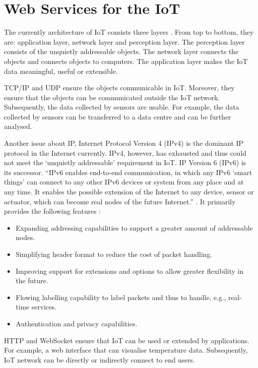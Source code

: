 \section{Web Services for the IoT}
The currently architecture of IoT consists three layers \cite{wu2010research}. From top to bottom, they are: application layer, network layer and perception layer. The perception layer consists of the unquietly addressable objects. The network layer connects the objects and connects objects to computers. The application layer makes the IoT data meaningful, useful or extensible.

TCP/IP and UDP ensure the objects communicable in IoT. Moreover, they ensure that the objects can be communicated outside the IoT network. Subsequently, the data collected by sensors are usable. For example, the data collected by sensors can be transferred to a data centre and can be further analysed. 

Another issue about IP, Internet Protocol Version 4 (IPv4) is the dominant IP protocol in the Internet currently. IPv4, however, has exhausted \cite{smith2011free} and thus could not meet the `unquietly addressable' requirement in IoT. IP Version 6 (IPv6) is its successor. ``IPv6 enables end-to-end communication, in which any IPv6 `smart things' can connect to any other IPv6 devices or system from any place and at any time. It enables the possible extension of the Internet to any device, sensor or actuator, which can become real nodes of the future Internet.'' \cite{vermesan2011internet}. It primarily provides the following features \cite{deering1998internet}: 

\begin{itemize}
\setlength{\itemsep}{0pt}
\item Expanding addressing capabilities to support a greater amount of addressable nodes. 
\item Simplifying header format to reduce the cost of packet handling.
\item Improving support for extensions and options to allow greater flexibility in the future.
\item Flowing labelling capability to label packets and thus to handle, e.g., real-time services.
\item Authentication and privacy capabilities.
\end{itemize}

HTTP and WebSocket ensure that IoT can be used or extended by applications. For example, a web interface that can visualise temperature data. Subsequently, IoT network can be directly or indirectly connect to end users. 

